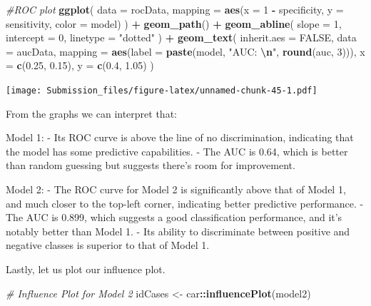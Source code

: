 \documentclass[
]{article}
\newenvironment{Shaded}{\begin{snugshade}}{\end{snugshade}}
\newcommand{\AttributeTok}[1]{\textcolor[rgb]{0.13,0.29,0.53}{#1}}
\newcommand{\CommentTok}[1]{\textcolor[rgb]{0.56,0.35,0.01}{\textit{#1}}}
\newcommand{\ConstantTok}[1]{\textcolor[rgb]{0.56,0.35,0.01}{#1}}
\newcommand{\DecValTok}[1]{\textcolor[rgb]{0.00,0.00,0.81}{#1}}
\newcommand{\FloatTok}[1]{\textcolor[rgb]{0.00,0.00,0.81}{#1}}
\newcommand{\FunctionTok}[1]{\textcolor[rgb]{0.13,0.29,0.53}{\textbf{#1}}}
\newcommand{\NormalTok}[1]{#1}
\newcommand{\OtherTok}[1]{\textcolor[rgb]{0.56,0.35,0.01}{#1}}
\newcommand{\SpecialCharTok}[1]{\textcolor[rgb]{0.81,0.36,0.00}{\textbf{#1}}}
\newcommand{\StringTok}[1]{\textcolor[rgb]{0.31,0.60,0.02}{#1}}
\begin{document}
\begin{Shaded}
\begin{Highlighting}[]
\CommentTok{\#ROC plot}
\FunctionTok{ggplot}\NormalTok{(}
  \AttributeTok{data =}\NormalTok{ rocData,}
  \AttributeTok{mapping =} \FunctionTok{aes}\NormalTok{(}\AttributeTok{x =} \DecValTok{1} \SpecialCharTok{{-}}\NormalTok{ specificity, }\AttributeTok{y =}\NormalTok{ sensitivity, }\AttributeTok{color =}\NormalTok{ model)}
\NormalTok{) }\SpecialCharTok{+}
  \FunctionTok{geom\_path}\NormalTok{() }\SpecialCharTok{+}
  \FunctionTok{geom\_abline}\NormalTok{(}
    \AttributeTok{slope =} \DecValTok{1}\NormalTok{,}
    \AttributeTok{intercept =} \DecValTok{0}\NormalTok{,}
    \AttributeTok{linetype =} \StringTok{"dotted"}
\NormalTok{  ) }\SpecialCharTok{+}
  \FunctionTok{geom\_text}\NormalTok{(}
  \AttributeTok{inherit.aes =} \ConstantTok{FALSE}\NormalTok{,}
  \AttributeTok{data =}\NormalTok{ aucData,}
  \AttributeTok{mapping =} \FunctionTok{aes}\NormalTok{(}\AttributeTok{label =} \FunctionTok{paste}\NormalTok{(model, }\StringTok{"AUC: }\SpecialCharTok{\textbackslash{}n}\StringTok{"}\NormalTok{, }\FunctionTok{round}\NormalTok{(auc, }\DecValTok{3}\NormalTok{))),}
  \AttributeTok{x =} \FunctionTok{c}\NormalTok{(}\FloatTok{0.25}\NormalTok{, }\FloatTok{0.15}\NormalTok{),}
  \AttributeTok{y =} \FunctionTok{c}\NormalTok{(}\FloatTok{0.4}\NormalTok{, }\FloatTok{1.05}\NormalTok{)}
\NormalTok{)}
\end{Highlighting}
\end{Shaded}

\texttt{[image: Submission\_files/figure-latex/unnamed-chunk-45-1.pdf]}

From the graphs we can interpret that:

Model 1: - Its ROC curve is above the line of no discrimination,
indicating that the model has some predictive capabilities. - The AUC is
0.64, which is better than random guessing but suggests there's room for
improvement.

Model 2: - The ROC curve for Model 2 is significantly above that of
Model 1, and much closer to the top-left corner, indicating better
predictive performance. - The AUC is 0.899, which suggests a good
classification performance, and it's notably better than Model 1. - Its
ability to discriminate between positive and negative classes is
superior to that of Model 1.

Lastly, let us plot our influence plot.

\begin{Shaded}
\begin{Highlighting}[]
\CommentTok{\# Influence Plot for Model 2}
\NormalTok{idCases }\OtherTok{\textless{}{-}}\NormalTok{ car}\SpecialCharTok{::}\FunctionTok{influencePlot}\NormalTok{(model2)}
\end{Highlighting}
\end{Shaded}
\end{document}
